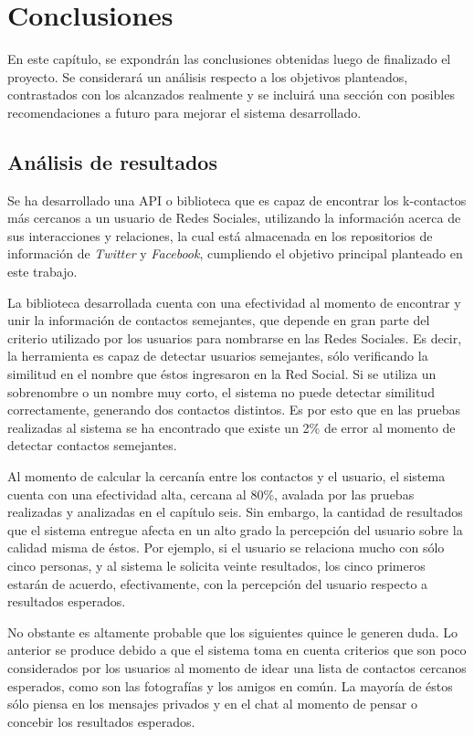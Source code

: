 \chapter{Conclusiones}

En este capítulo, se expondrán las conclusiones obtenidas luego de finalizado el proyecto. Se considerará un análisis respecto a los objetivos planteados, contrastados con los alcanzados realmente y se incluirá una sección con posibles recomendaciones a futuro para mejorar el sistema desarrollado.

\section{Análisis de resultados}

Se ha desarrollado una API o biblioteca que es capaz de encontrar los k-contactos más cercanos a un usuario de Redes Sociales, utilizando la información acerca de sus interacciones y relaciones, la cual está almacenada en los repositorios de información de \textit{Twitter} y \textit{Facebook}, cumpliendo el objetivo principal planteado en este trabajo.
 
La biblioteca desarrollada cuenta con una efectividad al momento de encontrar y unir la información de contactos semejantes, que depende en gran parte del criterio utilizado por los usuarios para nombrarse en las Redes Sociales. Es decir, la herramienta es capaz de detectar usuarios semejantes, sólo verificando la similitud en el nombre que éstos ingresaron en la Red Social. Si se utiliza un sobrenombre o un nombre muy corto, el sistema no puede detectar similitud correctamente, generando dos contactos distintos. Es por esto que en las pruebas realizadas al sistema se ha encontrado que existe un 2\% de error al momento de detectar contactos semejantes.

Al momento de calcular la cercanía entre los contactos y el usuario, el sistema cuenta con una efectividad alta, cercana al 80\%, avalada por las pruebas realizadas y analizadas en el capítulo seis.  Sin embargo, la cantidad de resultados que el sistema entregue afecta en un alto grado la percepción del usuario sobre la calidad misma de éstos. Por ejemplo, si el usuario se relaciona mucho con sólo cinco personas, y al sistema le solicita veinte resultados, los cinco primeros estarán de acuerdo, efectivamente, con la percepción del usuario respecto a resultados esperados. 

No obstante es altamente probable que los siguientes quince le generen duda. Lo anterior se produce debido a que el sistema toma en cuenta criterios que son poco considerados por los usuarios al momento de idear una lista de contactos cercanos esperados, como son las fotografías y los amigos en común. La mayoría de éstos sólo piensa en los mensajes privados y en el chat al momento de pensar o concebir los resultados esperados. 


